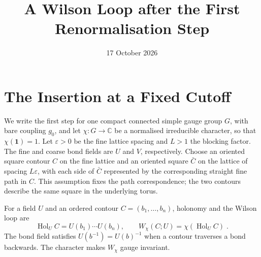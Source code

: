 \documentclass[11pt]{article}
\title{A Wilson Loop after the First Renormalisation Step}
\author{}
\date{17 October 2026}
\newcommand{\Hol}{\operatorname{Hol}}
\newcommand{\id}{\mathbf 1}
\begin{document}
\maketitle

\section{The Insertion at a Fixed Cutoff}

We write the first step for one compact connected simple gauge group $G$, with bare coupling $g_0$, and let $\chi \colon G \to \mathbb C$ be a normalised irreducible character, so that $\chi(\id)=1$. Let $\varepsilon>0$ be the fine lattice spacing and $L>1$ the blocking factor. The fine and coarse bond fields are $U$ and $V$, respectively. Choose an oriented square contour $C$ on the fine lattice and an oriented square $\bar C$ on the lattice of spacing $L\varepsilon$, with each side of $\bar C$ represented by the corresponding straight fine path in $C$. This assumption fixes the path correspondence; the two contours describe the same square in the underlying torus.

For a field $U$ and an ordered contour $C=(b_1,\ldots,b_n)$, holonomy and the Wilson loop are
\begin{equation}\label{eq:wilson-definition}
    \Hol_U C=U(b_1)\cdots U(b_n),
    \qquad W_\chi(C;U)=\chi(\Hol_U C)\;.
\end{equation}
The bond field satisfies $U(b^{-1})=U(b)^{-1}$ when a contour traverses a bond backwards. The character makes $W_\chi$ gauge invariant.
\end{document}
